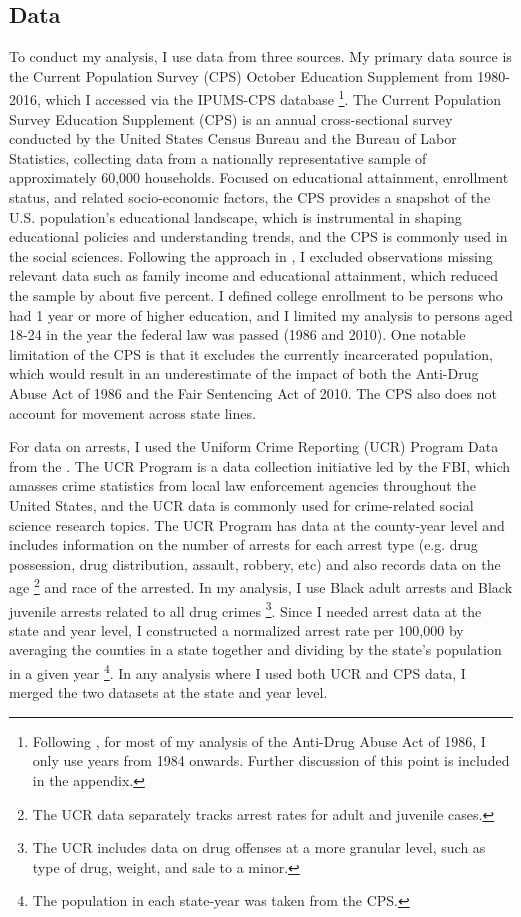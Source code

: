 \documentclass{article}
\begin{document}
\subsection{Data}
To conduct my analysis, I use data from three sources. My primary data source is the Current Population Survey (CPS) October Education Supplement from 1980-2016, which I accessed via the IPUMS-CPS database \citep{ipums_cps} \footnote{Following \cite{britton2022}, for most of my analysis of the Anti-Drug Abuse Act of 1986, I only use years from 1984 onwards. Further discussion of this point is included in the appendix.}. The Current Population Survey Education Supplement (CPS) is an annual cross-sectional survey conducted by the United States Census Bureau and the Bureau of Labor Statistics, collecting data from a nationally representative sample of approximately 60,000 households. Focused on educational attainment, enrollment status, and related socio-economic factors, the CPS provides a snapshot of the U.S. population's educational landscape, which is instrumental in shaping educational policies and understanding trends, and the CPS is commonly used in the social sciences. Following the approach in \cite{britton2022}, I excluded observations missing relevant data such as family income and educational attainment, which reduced the sample by about five percent. I defined college enrollment to be persons who had 1 year or more of higher education, and I limited my analysis to persons aged 18-24 in the year the federal law was passed (1986 and 2010). One notable limitation of the CPS is that it excludes the currently incarcerated population, which would result in an underestimate of the impact of both the Anti-Drug Abuse Act of 1986 and the Fair Sentencing Act of 2010. The CPS also does not account for movement across state lines.

For data on arrests, I used the Uniform Crime Reporting (UCR) Program Data from the \cite{ucr}. The UCR Program is a data collection initiative led by the FBI, which amasses crime statistics from local law enforcement agencies throughout the United States, and the UCR data is commonly used for crime-related social science research topics. The UCR Program has data at the county-year level and includes information on the number of arrests for each arrest type (e.g. drug possession, drug distribution, assault, robbery, etc) and also records data on the age \footnote{The UCR data separately tracks arrest rates for adult and juvenile cases.} and race of the arrested. In my analysis, I use Black adult arrests and Black juvenile arrests related to all drug crimes \footnote{The UCR includes data on drug offenses at a more granular level, such as type of drug, weight, and sale to a minor.}. Since I needed arrest data at the state and year level, I constructed a normalized arrest rate per 100,000 by averaging the counties in a state together and dividing by the state's population in a given year \footnote{The population in each state-year was taken from the CPS.}. In any analysis where I used both UCR and CPS data, I merged the two datasets at the state and year level.
\end{document}
